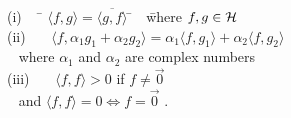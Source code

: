 \documentclass{ximera}
\begin{document}
\begin{tabbing}
(i)~~~\= $\langle f,g\rangle = \overline{\langle g,f\rangle}$ \=~~\= 
where $f,g \in\cal H$\\
(ii)~~~\> $\langle f,\alpha_1g_1+\alpha_2g_2\rangle = \alpha_1\langle f,g_1
\rangle +\alpha_2\langle f,g_2\rangle$\\
~\> where $\alpha_1$ and $\alpha_2$ are complex numbers\\
(iii)~~~\> $\langle f,f\rangle >0$ if $f\not= \vec 0$\\
~\> and $\langle f,f\rangle =0\Leftrightarrow f=\vec 0$ \quad .
\end{tabbing}
\end{document}
